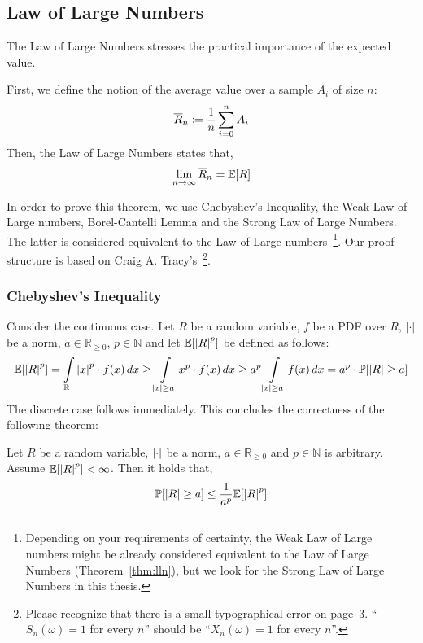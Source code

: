 \subsection{Law of Large Numbers}
\label{sec:bp-lln}
%
The Law of Large Numbers stresses the practical importance of the expected value.
\begin{theorem}\label{thm:lln}
  First, we define the notion of the average value over a sample $A_i$ of size $n$:
  \[ \overline{R}_n \coloneqq \frac1n \sum_{i=0}^n A_i \]
  Then, the Law of Large Numbers states that,
  \[ \lim_{n\to\infty} \overline{R}_n = \mathbb E[R] \]
\end{theorem}

In order to prove this theorem, we use Chebyshev's Inequality, the Weak Law of Large numbers,
Borel-Cantelli Lemma and the Strong Law of Large Numbers. The latter is considered equivalent
to the Law of Large numbers~\footnote{
  Depending on your requirements of certainty, the Weak Law of Large numbers might be already
  considered equivalent to the Law of Large Numbers (Theorem~\ref{thm:lln}), but we look
  for the Strong Law of Large Numbers in this thesis.
}. Our proof structure is based on Craig A. Tracy's~\cite{cnfgen}\footnote{
  Please recognize that there is a small typographical error on page~3.
  \enquote{$S_n(\omega) = 1$ for every $n$} should be \enquote{$X_n(\omega) = 1$ for every $n$}.
}.

\subsubsection{Chebyshev's Inequality}
\label{sec:bp-chebyshev}
%
Consider the continuous case.
Let $R$ be a random variable, $f$ be a PDF over $R$, $|\cdot|$ be a norm,
$a \in \mathbb R_{\geq 0}$, $p \in \mathbb N$ and let $\mathbb E[\left\lvert{R}\right\rvert^p]$ be defined as follows:
\begin{align*}
  \mathbb E[\left\lvert{R}\right\rvert^p]
          = \int\limits_{\mathbb R} \left\lvert{x}\right\rvert^p \cdot f(x) \, dx 
          \geq \int\limits_{\left\lvert{x}\right\rvert \geq a} x^p \cdot f(x) \, dx 
          \geq a^p \int\limits_{\left\lvert{x}\right\rvert \geq a} f(x) \, dx 
          = a^p \cdot \mathbb P[\left\lvert{R}\right\rvert \geq a]
\end{align*}
The discrete case follows immediately.
This concludes the correctness of the following theorem:
\begin{theorem}\label{thm:chebyshev}
  Let $R$ be a random variable, $\left\lvert{\cdot}\right\rvert$ be a norm, $a \in \mathbb R_{\geq 0}$ and $p \in \mathbb N$ is arbitrary.
  Assume $\mathbb E[\left\lvert{R}\right\rvert^p] < \infty$.
  Then it holds that,
  \[ \mathbb P[\left\lvert{R}\right\rvert \geq a] \leq \frac{1}{a^p} \mathbb E[\left\lvert{R}\right\rvert^p] \]
\end{theorem}


